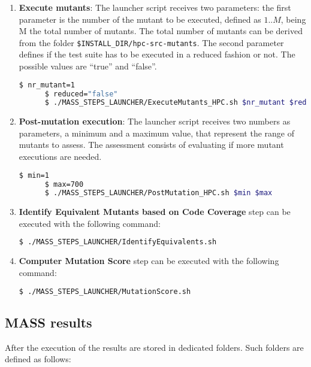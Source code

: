 \begin{enumerate}
	\item \textbf{Execute mutants}: The launcher script receives two parameters: the first parameter is the number of the mutant to be executed, defined as ${1..M}$, being M the total number of mutants. The total number of mutants can be derived from the folder \texttt{\$INSTALL\_DIR/hpc-src-mutants}.
	The second parameter defines if the test suite has to be executed in a reduced fashion or not. The possible values are ``true'' and ``false''.

	\begin{lstlisting}[language=bash]
	  $ nr_mutant=1
	  $ reduced="false"
	  $ ./MASS_STEPS_LAUNCHER/ExecuteMutants_HPC.sh $nr_mutant $reduced
\end{lstlisting}

	\item \textbf{Post-mutation execution}: The launcher script receives two numbers as parameters, a minimum and a maximum value, that represent the range of mutants to assess. The assessment consists of evaluating if more mutant executions are needed.

	\begin{lstlisting}[language=bash]
	  $ min=1
	  $	max=700
	  $ ./MASS_STEPS_LAUNCHER/PostMutation_HPC.sh $min $max
\end{lstlisting}

	\item \textbf{Identify Equivalent Mutants based on Code Coverage} step can be executed with the following command:

	\begin{lstlisting}[language=bash]
	  $ ./MASS_STEPS_LAUNCHER/IdentifyEquivalents.sh
\end{lstlisting}

	\item \textbf{Computer Mutation Score} step can be executed with the following command:

	\begin{lstlisting}[language=bash]
	  $ ./MASS_STEPS_LAUNCHER/MutationScore.sh
\end{lstlisting}
\end{enumerate}

\subsection{MASS results}

After the execution of \MASS the results are stored in dedicated folders. Such folders are defined as follows:

